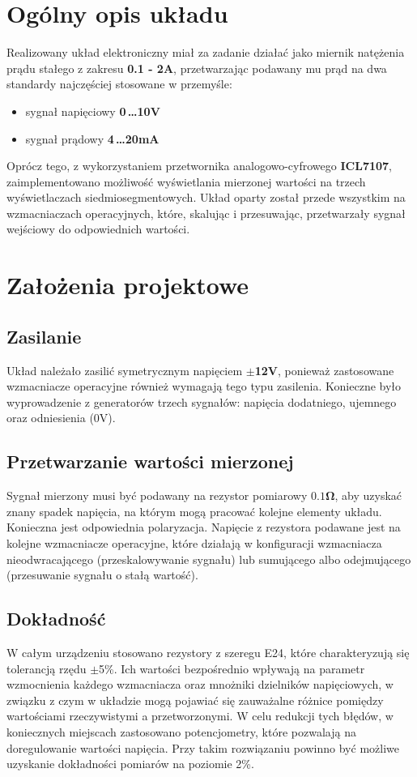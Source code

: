 \documentclass[12pt]{article}
\begin{document}
\newpage

\tableofcontents

\newpage

\section{Ogólny opis układu}
Realizowany układ elektroniczny miał za zadanie działać jako miernik natężenia prądu stałego z zakresu \textbf{0.1 - 2A}, przetwarzając podawany mu prąd na dwa standardy najczęściej stosowane w przemyśle:
\begin{itemize}
	\item sygnał napięciowy \textbf{0\,\dots10V}
	\item sygnał prądowy \textbf{4\,\dots20mA}
\end{itemize}
Oprócz tego, z wykorzystaniem przetwornika analogowo-cyfrowego \textbf{ICL7107}, zaimplementowano możliwość wyświetlania mierzonej wartości na trzech wyświetlaczach siedmiosegmentowych. Układ oparty został przede wszystkim na wzmacniaczach operacyjnych, które, skalując i przesuwając, przetwarzały sygnał wejściowy do odpowiednich wartości. \\

\section{Założenia projektowe}
\subsection{Zasilanie}
Układ należało zasilić symetrycznym napięciem $\pm$\textbf{12V}, ponieważ zastosowane wzmacniacze operacyjne również wymagają tego typu zasilenia. Konieczne było wyprowadzenie z generatorów trzech sygnałów: napięcia dodatniego, ujemnego oraz odniesienia (0V). 
\subsection{Przetwarzanie wartości mierzonej}
Sygnał mierzony musi być podawany na rezystor pomiarowy $\mathbf{0.1\Omega}$, aby uzyskać znany spadek napięcia, na którym mogą pracować kolejne elementy układu. Konieczna jest odpowiednia polaryzacja. Napięcie z rezystora podawane jest na kolejne wzmacniacze operacyjne, które działają w konfiguracji wzmacniacza nieodwracającego (przeskalowywanie sygnału) lub sumującego albo odejmującego (przesuwanie sygnału o stałą wartość). 
\subsection{Dokładność}
W całym urządzeniu stosowano rezystory z szeregu E24, które charakteryzują się tolerancją rzędu $\pm$5\%. Ich wartości bezpośrednio wpływają na parametr wzmocnienia każdego wzmacniacza oraz mnożniki dzielników napięciowych, w związku z czym w układzie mogą pojawiać się zauważalne różnice pomiędzy wartościami rzeczywistymi a przetworzonymi. W celu redukcji tych błędów, w koniecznych miejscach zastosowano potencjometry, które pozwalają na doregulowanie wartości napięcia. Przy takim rozwiązaniu powinno być możliwe uzyskanie dokładności pomiarów na poziomie 2\%. \\
\end{document}
